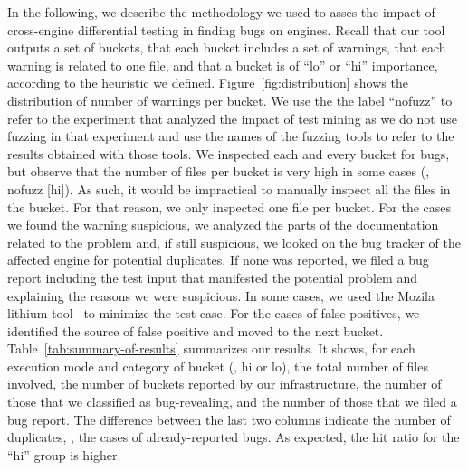 \documentclass[10pt,conference,anonymous]{IEEEtran}
\begin{document}
In the following, we describe the methodology we used to asses the
impact of cross-engine differential testing in finding bugs on \js{}
engines. Recall that our tool outputs a set of buckets, that each
bucket includes a set of warnings, that each warning is related to one
file, and that a bucket is of ``lo'' or ``hi'' importance, according
to the heuristic we defined. Figure~\ref{fig:distribution} shows the
distribution of number of warnings per bucket. We use the the label
``nofuzz'' to refer to the experiment that analyzed the impact of test
mining as we do not use fuzzing in that experiment and use the names
of the fuzzing tools to refer to the results obtained with those
tools. We inspected each and every bucket for bugs, but observe that
the number of files per bucket is very high in some cases (\eg{},
nofuzz [hi]). As such, it would be impractical to manually inspect all
the files in the bucket. For that reason, we only inspected one file
per bucket. For the cases we found the warning suspicious, we analyzed
the parts of the documentation related to the problem and, if still
suspicious, we looked on the bug tracker of the affected engine for
potential duplicates. If none was reported, we filed a bug report
including the test input that manifested the potential problem and
explaining the reasons we were suspicious. In some cases, we used the
Mozila lithium tool~\cite{lithium} to minimize the test case. For the
cases of false positives, we identified the source of false positive
and moved to the next bucket. Table~\ref{tab:summary-of-results}
summarizes our results. It shows, for each execution mode and category
of bucket (\ie{}, hi or lo), the total number of files involved, the
number of buckets reported by our infrastructure, the number of those
that we classified as bug-revealing, and the number of those that we
filed a bug report. The difference between the last two columns
indicate the number of duplicates, \ie{}, the cases of
already-reported bugs. As expected, the hit ratio for the ``hi'' group
is higher.
\end{document}
